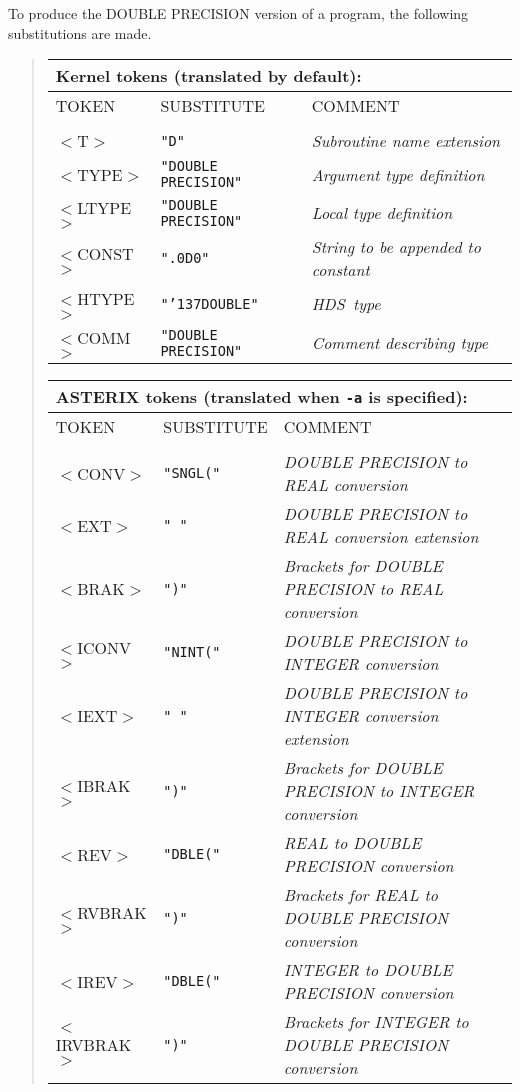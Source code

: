 \documentclass[twoside,11pt]{article}
\renewcommand{\_}{{\tt\char'137}}     %
\newcommand{\HDS}{{\footnotesize HDS}\normalsize}
\begin{document}
To produce the DOUBLE PRECISION version of a program, the following
substitutions are made.
\begin{quote}
\begin{tabular}{lll}
\multicolumn{3}{l}{\bf{Kernel} tokens (translated by default):} \\
\hline
TOKEN     &SUBSTITUTE  &COMMENT \\
\\
$<$T$>$     &{\tt "D"}               &{\em Subroutine name extension}\\
$<$TYPE$>$  &{\tt "DOUBLE PRECISION"}&{\em Argument type definition}\\
$<$LTYPE$>$ &{\tt "DOUBLE PRECISION"}&{\em Local type definition}\\
$<$CONST$>$ &{\tt ".0D0"}            &{\em String to be appended to constant} \\
$<$HTYPE$>$ &{\tt "\_DOUBLE"}        &{\em \HDS\ type}\\
$<$COMM$>$  &{\tt "DOUBLE PRECISION"}&{\em Comment describing type}\\
\end{tabular}

\begin{tabular}{lll}
\multicolumn{3}{l}{\bf{ASTERIX} tokens (translated when {\tt -a} is specified):}\\
\hline
TOKEN  &SUBSTITUTE  &COMMENT \\
\\
$<$CONV$>$ &{\tt "SNGL("} &{\em DOUBLE PRECISION to REAL conversion}\\
$<$EXT$>$  &{\tt " "}     &{\em DOUBLE PRECISION to REAL conversion extension}\\
$<$BRAK$>$ &{\tt ")"}     &{\em Brackets for DOUBLE PRECISION to REAL conversion}\\
$<$ICONV$>$ &{\tt "NINT("} &{\em DOUBLE PRECISION to INTEGER conversion}\\
$<$IEXT$>$  &{\tt " "}   &{\em DOUBLE PRECISION to INTEGER conversion extension}\\
$<$IBRAK$>$ &{\tt ")"} &{\em Brackets for DOUBLE PRECISION to INTEGER conversion}\\
$<$REV$>$   &{\tt "DBLE("} &{\em REAL to DOUBLE PRECISION conversion}\\
$<$RVBRAK$>$ &{\tt ")"}    &{\em Brackets for REAL to DOUBLE PRECISION conversion}\\
$<$IREV$>$  &{\tt "DBLE("} &{\em INTEGER to DOUBLE PRECISION conversion}\\
$<$IRVBRAK$>$ &{\tt ")"} &{\em Brackets for INTEGER to DOUBLE PRECISION conversion}\\
\end{tabular}
\end{quote}
\end{document}
